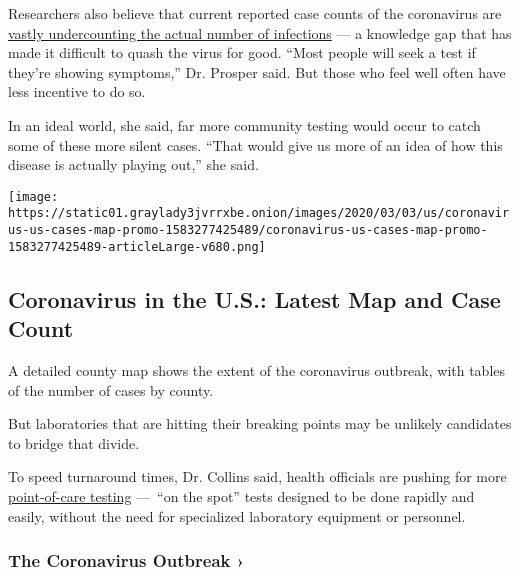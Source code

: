 Researchers also believe that current reported case counts of the
coronavirus are
\href{https://www.nytimes3xbfgragh.onion/2020/06/27/health/coronavirus-antibodies-asymptomatic.html}{vastly
undercounting the actual number of infections} --- a knowledge gap that
has made it difficult to quash the virus for good. ``Most people will
seek a test if they're showing symptoms,'' Dr. Prosper said. But those
who feel well often have less incentive to do so.

In an ideal world, she said, far more community testing would occur to
catch some of these more silent cases. ``That would give us more of an
idea of how this disease is actually playing out,'' she said.

\href{https://www.nytimes3xbfgragh.onion/interactive/2020/us/coronavirus-us-cases.html}{}

\texttt{[image: https://static01.graylady3jvrrxbe.onion/images/2020/03/03/us/coronavirus-us-cases-map-promo-1583277425489/coronavirus-us-cases-map-promo-1583277425489-articleLarge-v680.png]}

\hypertarget{coronavirus-in-the-us-latest-map-and-case-count}{%
\subsection{Coronavirus in the U.S.: Latest Map and Case
Count}\label{coronavirus-in-the-us-latest-map-and-case-count}}

A detailed county map shows the extent of the coronavirus outbreak, with
tables of the number of cases by county.

But laboratories that are hitting their breaking points may be unlikely
candidates to bridge that divide.

To speed turnaround times, Dr. Collins said, health officials are
pushing for more
\href{https://www.nytimes3xbfgragh.onion/2020/07/06/health/fast-coronavirus-tests.html}{point-of-care
testing} ---~``on the spot'' tests designed to be done rapidly and
easily, without the need for specialized laboratory equipment or
personnel.

\href{https://www.nytimes3xbfgragh.onion/news-event/coronavirus?action=click\&pgtype=Article\&state=default\&region=MAIN_CONTENT_3\&context=storylines_faq}{}

\hypertarget{the-coronavirus-outbreak-}{%
\subsubsection{The Coronavirus Outbreak
›}\label{the-coronavirus-outbreak-}}

